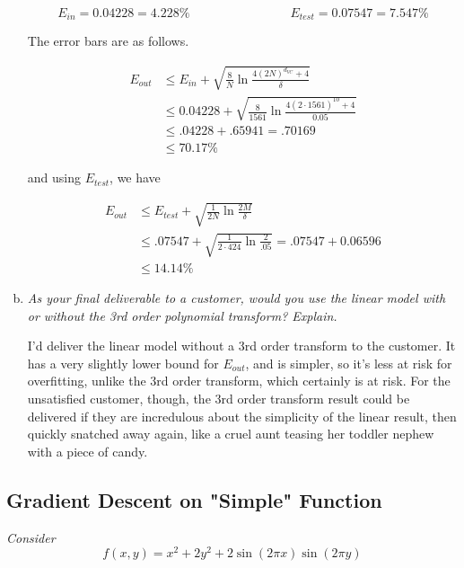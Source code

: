 \documentclass{article}
\begin{document}
\begin{enumerate}[(a)]
    $$E_{in} = 0.04228 = 4.228\% \qquad\qquad\qquad\qquad E_{test} = 0.07547 = 7.547\%$$

    The error bars are as follows.

    \begin{align*}
      E_{out} &\leq E_{in} + \sqrt{\frac{8}{N}\ln\frac{4(2N)^{d_{VC}} + 4}{\delta}} \\
      &\leq 0.04228 + \sqrt{\frac{8}{1561}\ln\frac{4(2\cdot1561)^{10} + 4}{0.05}} \\
      &\leq .04228 + .65941 = .70169 \\ 
      &\leq 70.17\%
    \end{align*}

    and using $E_{test}$, we have
    
    \begin{align*}
      E_{out} &\leq E_{test} + \sqrt{\frac{1}{2N}\ln\frac{2M}{\delta}} \\
      &\leq .07547 + \sqrt{\frac{1}{2\cdot424}\ln\frac{2}{.05}} = .07547 + 0.06596\\
      &\leq 14.14\%
    \end{align*}
    
  \item \textit{As your final deliverable to a customer, would you use the linear model with or 
    without the 3rd order polynomial transform? Explain.}

    I'd deliver the linear model without a 3rd order transform to the customer. It has a very
    slightly lower bound for $E_{out}$, and is simpler, so it's less at risk for overfitting,
    unlike the 3rd order transform, which certainly is at risk. For the unsatisfied customer,
    though, the 3rd order transform result could be delivered if they are incredulous about
    the simplicity of the linear result, then quickly snatched away again, like a cruel aunt 
    teasing her toddler nephew with a piece of candy.

\end{enumerate}


\subsection*{Gradient Descent on "Simple" Function}

\textit{Consider} $$f(x,y) = x^2 + 2y^2 + 2\sin{(2\pi x)}\sin{(2\pi y)}$$
\end{document}
